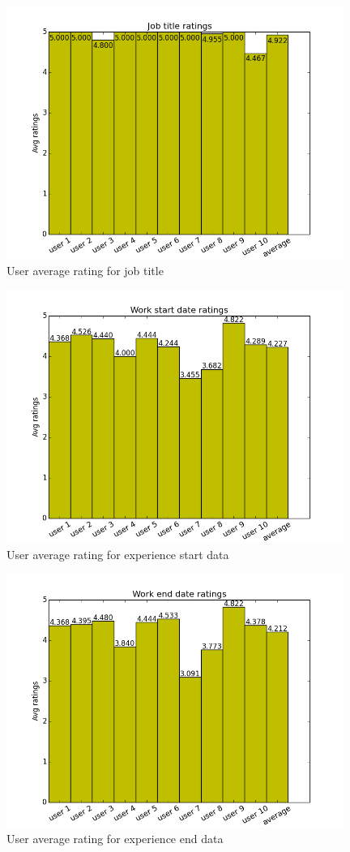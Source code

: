\begin{figure}[H]
\centering
\includegraphics[width=110mm]{images/evaluation/average_job_title_score.png}
\caption{User average rating for job title}
\label{fig:job_title}
\end{figure}

\begin{figure}[H]
\centering
\includegraphics[width=110mm]{images/evaluation/average_experience_start_date_score.png}
\caption{User average rating for experience start data}
\label{fig:experiencestart}
\end{figure}

\begin{figure}[H]
\centering
\includegraphics[width=110mm]{images/evaluation/average_experience_end_date_score.png}
\caption{User average rating for experience end data}
\label{fig:experienceend}
\end{figure}

